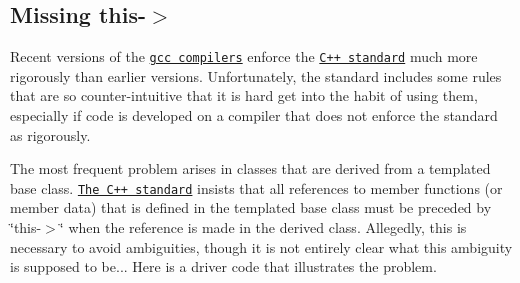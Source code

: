 \hypertarget{index_missing_this}{}\subsection{Missing \textquotesingle{}this-\/$>$\textquotesingle{}}\label{index_missing_this}
Recent versions of the \href{http://gcc.gnu.org/}{\tt gcc compilers} enforce the \href{http://www.open-std.org/jtc1/sc22/wg21/}{\tt C++ standard} much more rigorously than earlier versions. Unfortunately, the standard includes some rules that are so counter-\/intuitive that it is hard get into the habit of using them, especially if code is developed on a compiler that does not enforce the standard as rigorously.

The most frequent problem arises in classes that are derived from a templated base class. \href{http://www.open-std.org/jtc1/sc22/wg21/}{\tt The C++ standard} insists that all references to member functions (or member data) that is defined in the templated base class must be preceded by \char`\"{}this-\/$>$\char`\"{} when the reference is made in the derived class. Allegedly, this is necessary to avoid ambiguities, though it is not entirely clear what this ambiguity is supposed to be... Here is a driver code that illustrates the problem.


